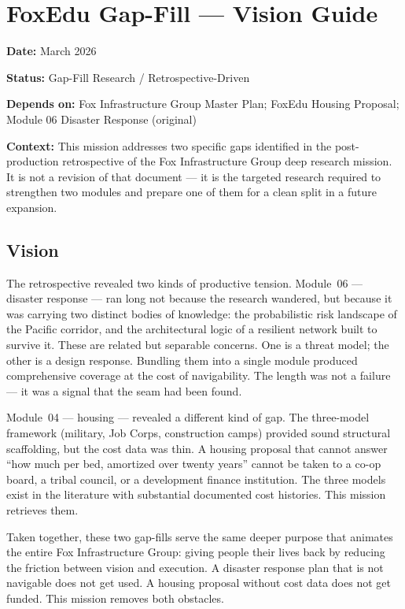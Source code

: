 \documentclass[11pt,letterpaper]{article}
\newcommand{\metafield}[2]{\textbf{\sffamily #1} #2\par}
\begin{document}
\section{FoxEdu Gap-Fill --- Vision Guide}

\metafield{Date:}{March 2026}
\metafield{Status:}{Gap-Fill Research / Retrospective-Driven}
\metafield{Depends on:}{Fox Infrastructure Group Master Plan; FoxEdu Housing Proposal; Module 06 Disaster Response (original)}
\metafield{Context:}{This mission addresses two specific gaps identified in the post-production retrospective of the Fox Infrastructure Group deep research mission. It is not a revision of that document --- it is the targeted research required to strengthen two modules and prepare one of them for a clean split in a future expansion.}

\subsection{Vision}

The retrospective revealed two kinds of productive tension. Module~06 --- disaster response --- ran long not because the research wandered, but because it was carrying two distinct bodies of knowledge: the probabilistic risk landscape of the Pacific corridor, and the architectural logic of a resilient network built to survive it. These are related but separable concerns. One is a threat model; the other is a design response. Bundling them into a single module produced comprehensive coverage at the cost of navigability. The length was not a failure --- it was a signal that the seam had been found.

Module~04 --- housing --- revealed a different kind of gap. The three-model framework (military, Job Corps, construction camps) provided sound structural scaffolding, but the cost data was thin. A housing proposal that cannot answer ``how much per bed, amortized over twenty years'' cannot be taken to a co-op board, a tribal council, or a development finance institution. The three models exist in the literature with substantial documented cost histories. This mission retrieves them.

Taken together, these two gap-fills serve the same deeper purpose that animates the entire Fox Infrastructure Group: giving people their lives back by reducing the friction between vision and execution. A disaster response plan that is not navigable does not get used. A housing proposal without cost data does not get funded. This mission removes both obstacles.
\end{document}
